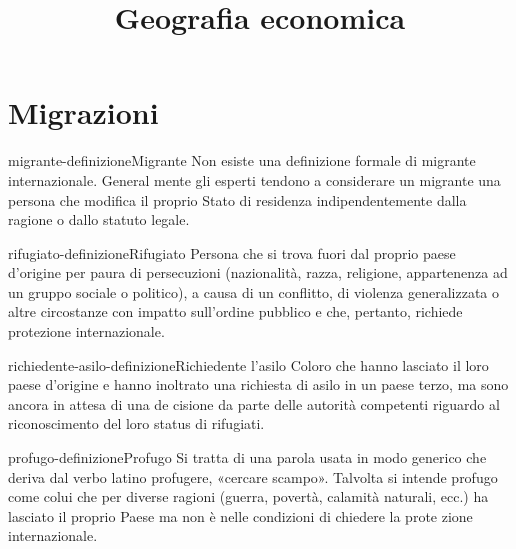 \documentclass[preview]{standalone}
\begin{document}
\title{Geografia economica}
\genpage

\section{Migrazioni}

\begin{snippetdefinition}{migrante-definizione}{Migrante}
    Non esiste una definizione formale di migrante internazionale. General
    mente gli esperti tendono a considerare un migrante una persona che
    modifica il proprio Stato di residenza indipendentemente dalla ragione
    o dallo statuto legale.
\end{snippetdefinition}

\begin{snippetdefinition}{rifugiato-definizione}{Rifugiato}
    Persona che si trova fuori dal proprio paese d'origine per paura di persecuzioni
    (nazionalità, razza, religione, appartenenza ad un gruppo sociale o politico),
    a causa di un conflitto, di violenza generalizzata o altre
    circostanze con impatto sull'ordine pubblico e che, pertanto, richiede
    protezione internazionale.
\end{snippetdefinition}

\begin{snippetdefinition}{richiedente-asilo-definizione}{Richiedente l'asilo}
    Coloro che hanno lasciato il loro paese d'origine e hanno inoltrato una
    richiesta di asilo in un paese terzo, ma sono ancora in attesa di una
    de cisione da parte delle autorità competenti riguardo al riconoscimento
    del loro status di rifugiati.
\end{snippetdefinition}

\begin{snippetdefinition}{profugo-definizione}{Profugo}
    Si tratta di una parola usata in modo generico che deriva dal verbo latino
    profugere, «cercare scampo». Talvolta si intende profugo come
    colui che per diverse ragioni (guerra, povertà, calamità naturali, ecc.) ha
    lasciato il proprio Paese ma non è nelle condizioni di chiedere la prote zione internazionale.
\end{snippetdefinition}


\newcommand{\greenbox}{
    \fcolorbox{black}{green}{\rule{0pt}{5pt}\rule{5pt}{0pt}}
}

\newcommand{\redbox}{
    \fcolorbox{black}{red}{\rule{0pt}{5pt}\rule{5pt}{0pt}}
}
\end{document}
